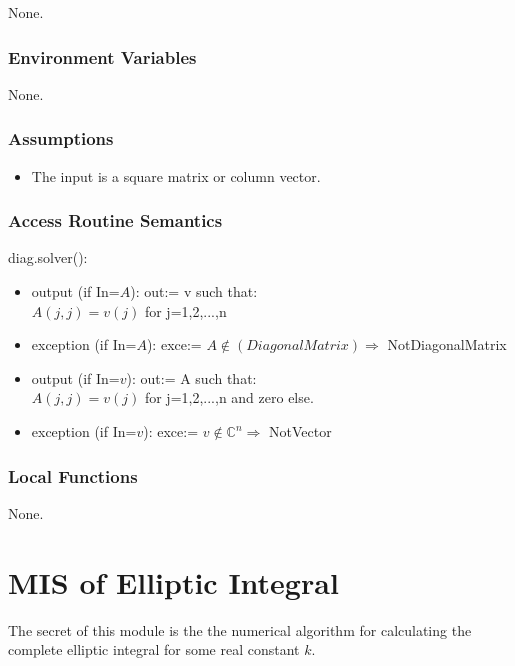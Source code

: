 \documentclass[12pt, titlepage]{article}
\begin{document}
None.

\subsubsection{Environment Variables}

None.

\subsubsection{Assumptions}

\begin{itemize}
	\item The input is a square matrix or column vector.  
\end{itemize}

\subsubsection{Access Routine Semantics}

\noindent diag.solver():
\begin{itemize}
	\item output (if In=$A$): out:= v such that:\\
	$A(j,j) = v(j)$ for j=1,2,...,n \\
	\item exception (if In=$A$): exce:= $A \not\in (Diagonal Matrix) 
	\Rightarrow$ 
	NotDiagonalMatrix 
	\item output (if In=$v$): out:= A such that:\\
	$A(j,j) = v(j)$ for j=1,2,...,n and zero else. \\
	\item exception (if In=$v$): exce:= $v \not\in \mathbb{C}^{n} \Rightarrow$ 
	NotVector 
\end{itemize} 

\subsubsection{Local Functions} 

None. 

\newpage 

\section{MIS of Elliptic Integral} \label{MEI}

The secret of this module is the the numerical algorithm for calculating the 
complete 
elliptic integral for some real constant $k$.
\end{document}
